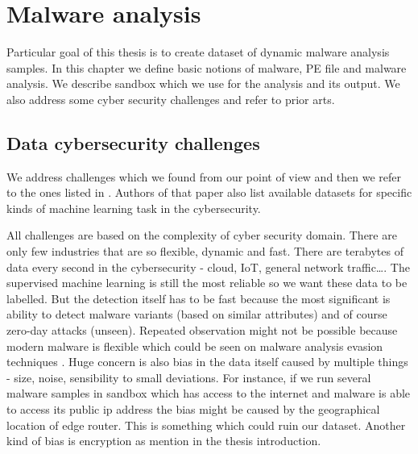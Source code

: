 


\chapter{Malware analysis} \label{chap:analysis}
Particular goal of this thesis is to create dataset of dynamic malware analysis samples. In this chapter we define basic notions of malware, PE file and malware analysis. We describe sandbox which we use for the analysis and its output. We also address some cyber security challenges and refer to prior arts.


\section{Data cybersecurity challenges}
We address challenges which we found from our point of view and then we refer to the ones listed in \cite{Amit2019}. Authors of that paper also list available datasets for specific kinds of machine learning task in the cybersecurity.

All challenges are based on the complexity of cyber security domain. There are only few industries that are so flexible, dynamic and fast. There are terabytes of data every second in the cybersecurity - cloud, IoT, general network traffic\dots. The supervised machine learning is still the most reliable so we want these data to be labelled. But the detection itself has to be fast because the most significant is ability to detect malware variants (based on similar attributes) and of course zero-day attacks (unseen). Repeated observation might not be possible because modern malware is flexible which could be seen on malware analysis evasion techniques \cite{Afianian2018}. Huge concern is also bias in the data itself caused by multiple things - size, noise, sensibility to small deviations. For instance, if we run several malware samples in sandbox which has access to the internet and malware is able to access its public ip address the bias might be caused by the geographical location of edge router. This is something which could ruin our dataset. Another kind of bias is encryption as mention in the thesis introduction.

